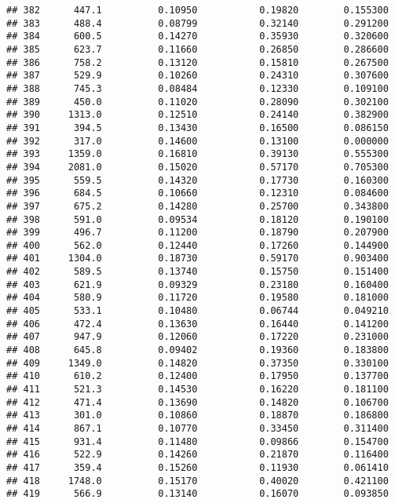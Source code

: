 \documentclass[
]{article}
\begin{document}
\begin{verbatim}
## 382      447.1          0.10950           0.19820        0.155300
## 383      488.4          0.08799           0.32140        0.291200
## 384      600.5          0.14270           0.35930        0.320600
## 385      623.7          0.11660           0.26850        0.286600
## 386      758.2          0.13120           0.15810        0.267500
## 387      529.9          0.10260           0.24310        0.307600
## 388      745.3          0.08484           0.12330        0.109100
## 389      450.0          0.11020           0.28090        0.302100
## 390     1313.0          0.12510           0.24140        0.382900
## 391      394.5          0.13430           0.16500        0.086150
## 392      317.0          0.14600           0.13100        0.000000
## 393     1359.0          0.16810           0.39130        0.555300
## 394     2081.0          0.15020           0.57170        0.705300
## 395      559.5          0.14320           0.17730        0.160300
## 396      684.5          0.10660           0.12310        0.084600
## 397      675.2          0.14280           0.25700        0.343800
## 398      591.0          0.09534           0.18120        0.190100
## 399      496.7          0.11200           0.18790        0.207900
## 400      562.0          0.12440           0.17260        0.144900
## 401     1304.0          0.18730           0.59170        0.903400
## 402      589.5          0.13740           0.15750        0.151400
## 403      621.9          0.09329           0.23180        0.160400
## 404      580.9          0.11720           0.19580        0.181000
## 405      533.1          0.10480           0.06744        0.049210
## 406      472.4          0.13630           0.16440        0.141200
## 407      947.9          0.12060           0.17220        0.231000
## 408      645.8          0.09402           0.19360        0.183800
## 409     1349.0          0.14820           0.37350        0.330100
## 410      610.2          0.12400           0.17950        0.137700
## 411      521.3          0.14530           0.16220        0.181100
## 412      471.4          0.13690           0.14820        0.106700
## 413      301.0          0.10860           0.18870        0.186800
## 414      867.1          0.10770           0.33450        0.311400
## 415      931.4          0.11480           0.09866        0.154700
## 416      522.9          0.14260           0.21870        0.116400
## 417      359.4          0.15260           0.11930        0.061410
## 418     1748.0          0.15170           0.40020        0.421100
## 419      566.9          0.13140           0.16070        0.093850

\end{verbatim}
\end{document}
